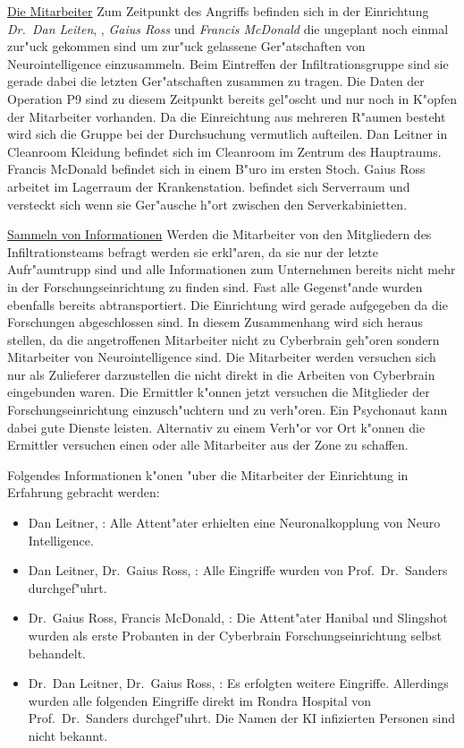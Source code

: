 \underline{Die Mitarbeiter} Zum Zeitpunkt des Angriffs befinden sich in der Einrichtung \emph{Dr.~Dan Leiten}, \emph{\ml{}}, \emph{Gaius Ross} und \emph{Francis McDonald} die ungeplant noch einmal zur"uck gekommen sind um zur"uck gelassene Ger"atschaften von Neurointelligence einzusammeln. Beim Eintreffen der Infiltrationsgruppe sind sie gerade dabei die letzten Ger"atschaften zusammen zu tragen. Die Daten der Operation P9 sind zu diesem Zeitpunkt bereits gel"oscht und nur noch in K"opfen der Mitarbeiter vorhanden. Da die Einreichtung aus mehreren R"aumen besteht wird sich die Gruppe bei der Durchsuchung vermutlich aufteilen. Dan Leitner in Cleanroom Kleidung befindet sich im Cleanroom im Zentrum des Hauptraums. Francis McDonald befindet sich in einem B"uro im ersten Stoch. Gaius Ross arbeitet im Lagerraum der Krankenstation. \ml{} befindet sich Serverraum und versteckt sich wenn sie Ger"ausche h"ort zwischen den Serverkabinietten.

\underline{Sammeln von Informationen} Werden die Mitarbeiter von den Mitgliedern des Infiltrationsteams befragt werden sie erkl"aren, da\3 
sie nur der letzte Aufr"aumtrupp sind und alle Informationen zum Unternehmen bereits nicht mehr in der Forschungseinrichtung zu finden sind. Fast alle Gegenst"ande wurden ebenfalls bereits abtransportiert. Die Einrichtung wird gerade aufgegeben da die Forschungen abgeschlossen sind. In diesem Zusammenhang wird sich heraus stellen, da\3 die angetroffenen Mitarbeiter nicht zu Cyberbrain geh"oren sondern Mitarbeiter von Neurointelligence sind. Die Mitarbeiter werden versuchen sich nur als Zulieferer darzustellen die nicht direkt in die Arbeiten von Cyberbrain eingebunden waren. Die Ermittler k"onnen jetzt versuchen die Mitglieder der Forschungseinrichtung einzusch"uchtern und zu verh"oren. Ein Psychonaut kann dabei gute Dienste leisten. Alternativ zu einem Verh"or vor Ort k"onnen die Ermittler versuchen einen oder alle Mitarbeiter aus der Zone zu schaffen. 

Folgendes Informationen k"onen "uber die Mitarbeiter der Einrichtung in Erfahrung gebracht werden:

\begin{itemize}
	\item Dan Leitner, \ml{}: Alle Attent"ater erhielten eine Neuronalkopplung von Neuro Intelligence.
	\item Dan Leitner, Dr.~Gaius Ross, \ml{}: Alle Eingriffe wurden von Prof.~Dr.~Sanders durchgef"uhrt.
	\item Dr.~Gaius Ross, Francis McDonald, \ml{}: Die Attent"ater Hanibal und Slingshot wurden als erste Probanten in der Cyberbrain 			Forschungseinrichtung selbst behandelt.	
	\item Dr.~Dan Leitner, Dr.~Gaius Ross, \ml{}: Es erfolgten weitere Eingriffe. Allerdings wurden alle folgenden Eingriffe direkt im 			Rondra Hospital von Prof.~Dr.~Sanders durchgef"uhrt. Die Namen der KI infizierten Personen sind nicht bekannt.
\end{itemize}

